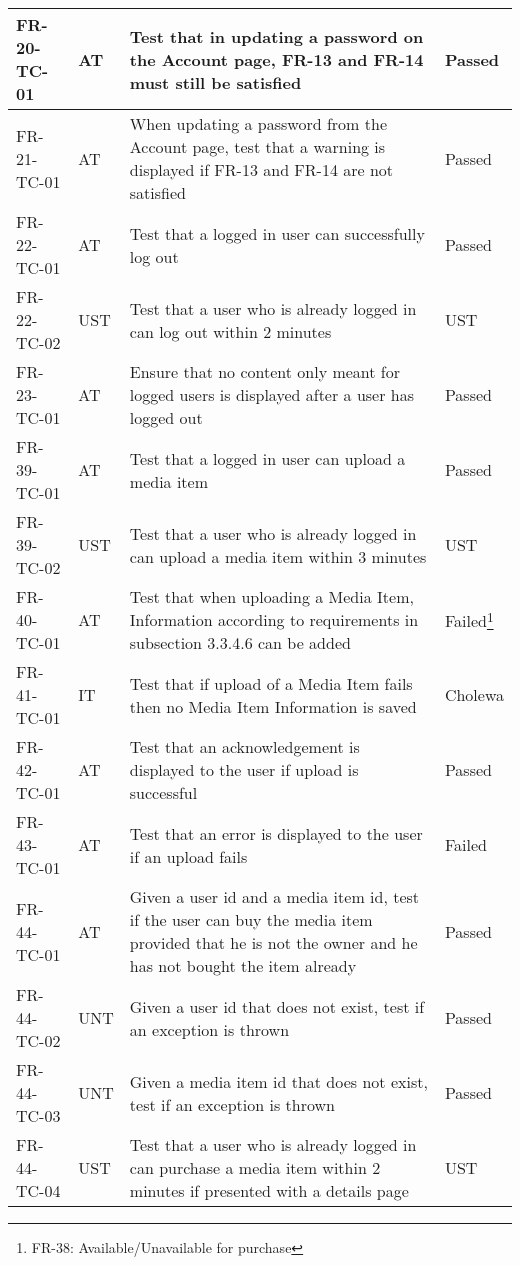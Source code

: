 \documentclass[../report.tex]{subfiles}
\begin{document}
\begin{longtable}{|L{2.1cm}|L{1cm}|L{12.4cm}|L{1.4cm}|}
FR-20-TC-01&AT&Test that in updating a password on the Account page, FR-13 and FR-14 must still be satisfied&Passed  \\ \hline
FR-21-TC-01&AT&When updating a password from the Account page, test that a warning is displayed if FR-13 and FR-14 are not satisfied&Passed  \\ \hline
FR-22-TC-01&AT&Test that a logged in user can successfully log out&Passed  \\ \hline
FR-22-TC-02&UST&Test that a user who is already logged in can log out within 2 minutes&UST  \\ \hline
FR-23-TC-01&AT&Ensure that no content only meant for logged users is displayed after a user has logged out&Passed  \\ \hline
FR-39-TC-01&AT&Test that a logged in user can upload a media item&Passed  \\ \hline
FR-39-TC-02&UST&Test that a user who is already logged in can upload a media item within 3 minutes&UST  \\ \hline
FR-40-TC-01&AT&Test that when uploading a Media Item, Information according to requirements in subsection 3.3.4.6 can be added&Failed\footnote{\label{note1} FR-38: Available/Unavailable for purchase}  \\ \hline
FR-41-TC-01&IT&Test that if upload of a Media Item fails then no Media Item Information is saved&Cholewa  \\ \hline
FR-42-TC-01&AT&Test that an acknowledgement is displayed to the user if upload is successful&Passed  \\ \hline
FR-43-TC-01&AT&Test that an error is displayed to the user if an upload fails&Failed  \\ \hline
FR-44-TC-01&AT&Given a user id and a media item id, test if the user can buy the media item provided that he is not the owner and he has not bought the item already&Passed  \\ \hline
FR-44-TC-02&UNT&Given a user id that does not exist, test if an exception is thrown&Passed  \\ \hline
FR-44-TC-03&UNT&Given a media item id that does not exist, test if an exception is thrown&Passed  \\ \hline
FR-44-TC-04&UST&Test that a user who is already logged in can purchase a media item within 2 minutes if presented with a details page&UST  \\ \hline

\end{longtable}
\end{document}
